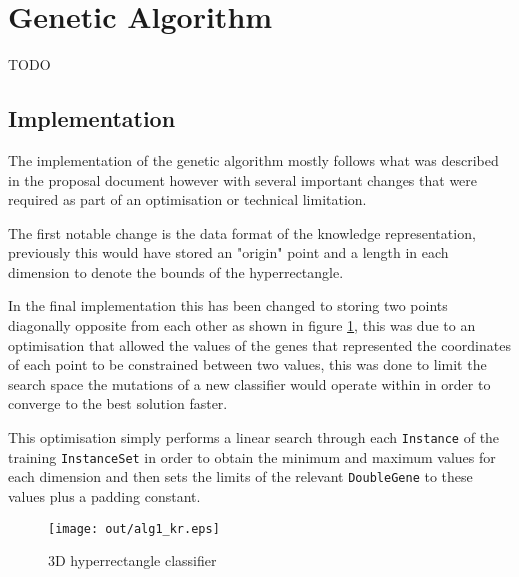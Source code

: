 \documentclass[a4paper]{article}
\title{\DOCTITLE}
\author{\DOCAUTHOR}
\date{\DOCDATE}
\begin{document}
\maketitle

\begin{abstract}
  This report will give an overview of the two nature inspired algorithms that
  were implemented to solve the classification problem, how they differ from
  what was outlined in the proposal and a critical evaluation between the
  performance of both in terms of learning time and classification accuracy.
\end{abstract}

\section{Genetic Algorithm}
\label{sec:ga}

TODO

\subsection{Implementation}
\label{sec:ga_implementation}

The implementation of the genetic algorithm mostly follows what was described in
the proposal document however with several important changes that were required
as part of an optimisation or technical limitation.

The first notable change is the data format of the knowledge representation,
previously this would have stored an "origin" point and a length in each
dimension to denote the bounds of the hyperrectangle.

In the final implementation this has been changed to storing two points
diagonally opposite from each other as shown in figure \ref{fig:ga_kr}, this was
due to an optimisation that allowed the values of the genes that represented the
coordinates of each point to be constrained between two values, this was done to
limit the search space the mutations of a new classifier would operate within in
order to converge to the best solution faster.

This optimisation simply performs a linear search through each \texttt{Instance}
of the training \texttt{InstanceSet} in order to obtain the minimum and maximum
values for each dimension and then sets the limits of the relevant
\texttt{DoubleGene} to these values plus a padding constant.

\begin{figure}[h!]
  \centering
  \texttt{[image: out/alg1\_kr.eps]}
  \caption{3D hyperrectangle classifier}
  \label{fig:ga_kr}
\end{figure}
\end{document}
